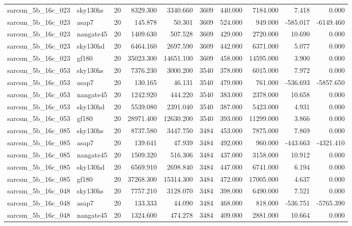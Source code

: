 \documentclass{article}
\begin{document}
\begin{longtable}{llrrrrrrrr}
sarcsm\_5b\_16c\_023 & sky130hs & 20 & 8329.300 & 3340.660 & 3609 & 440.000 & 7184.000 & 7.418 & 0.000 \\
sarcsm\_5b\_16c\_023 & asap7 & 20 & 145.878 & 50.301 & 3609 & 524.000 & 949.000 & -585.017 & -6149.460 \\
sarcsm\_5b\_16c\_023 & nangate45 & 20 & 1409.630 & 507.528 & 3609 & 429.000 & 2720.000 & 10.690 & 0.000 \\
sarcsm\_5b\_16c\_023 & sky130hd & 20 & 6464.160 & 2697.590 & 3609 & 442.000 & 6371.000 & 5.077 & 0.000 \\
sarcsm\_5b\_16c\_023 & gf180 & 20 & 35023.300 & 14651.100 & 3609 & 458.000 & 14595.000 & 3.900 & 0.000 \\
sarcsm\_5b\_16c\_053 & sky130hs & 20 & 7376.230 & 3000.200 & 3540 & 378.000 & 6015.000 & 7.972 & 0.000 \\
sarcsm\_5b\_16c\_053 & asap7 & 20 & 130.165 & 46.131 & 3540 & 479.000 & 761.000 & -536.693 & -5857.650 \\
sarcsm\_5b\_16c\_053 & nangate45 & 20 & 1242.920 & 444.220 & 3540 & 383.000 & 2378.000 & 10.658 & 0.000 \\
sarcsm\_5b\_16c\_053 & sky130hd & 20 & 5539.080 & 2391.040 & 3540 & 387.000 & 5423.000 & 4.931 & 0.000 \\
sarcsm\_5b\_16c\_053 & gf180 & 20 & 28971.400 & 12630.200 & 3540 & 393.000 & 11299.000 & 3.866 & 0.000 \\
sarcsm\_5b\_16c\_085 & sky130hs & 20 & 8737.580 & 3447.750 & 3484 & 453.000 & 7875.000 & 7.869 & 0.000 \\
sarcsm\_5b\_16c\_085 & asap7 & 20 & 139.641 & 47.939 & 3484 & 492.000 & 960.000 & -443.663 & -4321.410 \\
sarcsm\_5b\_16c\_085 & nangate45 & 20 & 1509.320 & 516.306 & 3484 & 437.000 & 3158.000 & 10.912 & 0.000 \\
sarcsm\_5b\_16c\_085 & sky130hd & 20 & 6569.910 & 2698.840 & 3484 & 447.000 & 6741.000 & 6.194 & 0.000 \\
sarcsm\_5b\_16c\_085 & gf180 & 20 & 37268.300 & 15314.300 & 3484 & 472.000 & 17005.000 & 4.637 & 0.000 \\
sarcsm\_5b\_16c\_048 & sky130hs & 20 & 7757.210 & 3128.070 & 3484 & 398.000 & 6490.000 & 7.521 & 0.000 \\
sarcsm\_5b\_16c\_048 & asap7 & 20 & 133.333 & 44.090 & 3484 & 468.000 & 818.000 & -536.751 & -5765.390 \\
sarcsm\_5b\_16c\_048 & nangate45 & 20 & 1324.600 & 474.278 & 3484 & 409.000 & 2881.000 & 10.664 & 0.000 \\

\end{longtable}
\end{document}
